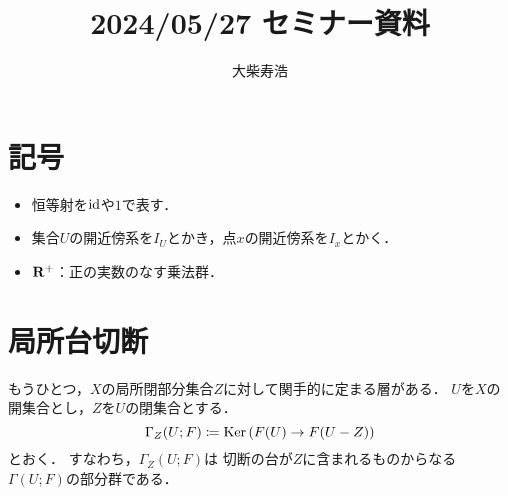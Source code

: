 





\def\inner<#1>{\langle #1 \rangle}








\title{2024/05/27 セミナー資料}
\author{大柴寿浩}
\date{}

\maketitle

\section*{記号}
\begin{itemize}
    \item 恒等射を\(\mathop{\mathrm{id}}\nolimits\)や\(1\)で表す．
    \item 集合\(U\)の開近傍系を\(I_U\)とかき，点\(x\)の開近傍系を\(I_x\)とかく．
    \item \(\mathbf{R}^+\)：正の実数のなす乗法群．
\end{itemize}

\section{局所台切断}

もうひとつ，\(X\)の局所閉部分集合\(Z\)に対して関手的に定まる層がある．
\(U\)を\(X\)の開集合とし，\(Z\)を\(U\)の閉集合とする．
\begin{equation}
    \Gamma_Z(U;F)\coloneqq
    \mathop{\mathrm{Ker}}\nolimits\left(F(U)\to F(U-Z)\right)
\end{equation}
とおく．
すなわち，\(\Gamma_Z(U;F)\)は
切断の台が\(Z\)に含まれるものからなる\(\Gamma(U;F)\)の部分群である．

